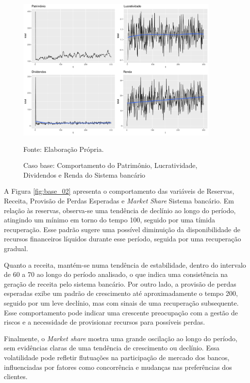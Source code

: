 \documentclass[hidelinks, article,12pt,oneside,a4paper,english,brazil,sumario=tradicional]{abntex2}
\begin{document}
\begin{figure} [H]
\caption{Caso base: Comportamento do Patrimônio, Lucratividade, Dividendos e Renda do Sistema bancário} \label{fig:base_01}
\centering %

\includegraphics[width=0.9\textwidth]{figs/base_01.pdf}

Fonte: Elaboração Própria.
\label{fig:dec_var_fbcf}
\end{figure}

A Figura \ref{fig:base_02} apresenta o comportamento das variáveis de Reservas, Receita, Provisão de Perdas Esperadas e\textit{ Market Share} Sistema bancário. Em relação às reservas, observa-se uma tendência de declínio ao longo do período, atingindo um mínimo em torno do tempo 100, seguido por uma tímida recuperação. Esse padrão sugere uma possível diminuição da disponibilidade de recursos financeiros líquidos durante esse período, seguida por uma recuperação gradual. 

Quanto a receita, mantém-se numa tendência de estabilidade, dentro do intervalo de 60 a 70 ao longo do período analisado, o que indica uma consistência na geração de receita pelo sistema bancário. Por outro lado, a provisão de perdas esperadas exibe um padrão de crescimento até aproximadamente o tempo 200, seguido por um leve declínio, mas com sinais de uma recuperação subsequente. Esse comportamento pode indicar uma crescente preocupação com a gestão de riscos e a necessidade de provisionar recursos para possíveis perdas. 

Finalmente, o \textit{Market share} mostra uma grande oscilação ao longo do período, sem evidências claras de uma tendência de crescimento ou declínio. Essa volatilidade pode refletir flutuações na participação de mercado dos bancos, influenciadas por fatores como concorrência e mudanças nas preferências dos clientes.
\end{document}

